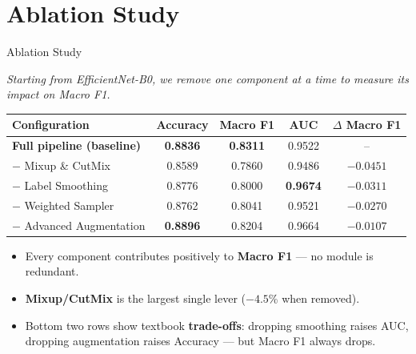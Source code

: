 \documentclass[10pt, aspectratio=169]{beamer}
\renewcommand{\framesubtitle}[1]{%
  \vspace*{-0.3em}\noindent{\large\bfseries\textcolor{usthdark}{#1}}\par\vspace{0.6em}%
}
\begin{document}
\section{Ablation Study}
\begin{frame}{Ablation Study}
    \framesubtitle{Contribution of Each Component}
    \scriptsize
    \textit{Starting from EfficientNet-B0, we remove one component at a time to measure its impact on Macro F1.}
    \vspace{0.2cm}
    \begin{table}[]
        \centering
        \begin{tabular}{lcccc}
        \toprule
        \rowcolor{usthblue!25}
        \textbf{Configuration} & \textbf{Accuracy} & \textbf{Macro F1} & \textbf{AUC} & \textbf{$\Delta$ Macro F1} \\
        \midrule
        \textbf{Full pipeline (baseline)} & \textbf{0.8836} & \textbf{0.8311} & 0.9522 & -- \\
        \midrule
        $-$ Mixup \& CutMix          & 0.8589 & 0.7860 & 0.9486 & \textcolor{usthred}{\textbf{$-0.0451$}} \\
        $-$ Label Smoothing          & 0.8776 & 0.8000 & \textbf{0.9674} & \textcolor{usthred}{$-0.0311$} \\
        $-$ Weighted Sampler         & 0.8762 & 0.8041 & 0.9521 & \textcolor{usthred}{$-0.0270$} \\
        $-$ Advanced Augmentation    & \textbf{0.8896} & 0.8204 & 0.9664 & \textcolor{usthred}{$-0.0107$} \\
        \bottomrule
        \end{tabular}
    \end{table}

    \vspace{0.3cm}
    \footnotesize
    \begin{itemize}
        \item Every component contributes positively to \textbf{Macro F1} --- no module is redundant.
        \item \textbf{Mixup/CutMix} is the largest single lever ($-4.5$\% when removed).
        \item Bottom two rows show textbook \textbf{trade-offs}: dropping smoothing raises AUC, dropping augmentation raises Accuracy --- but Macro F1 always drops.
    \end{itemize}
\end{frame}
\end{document}
